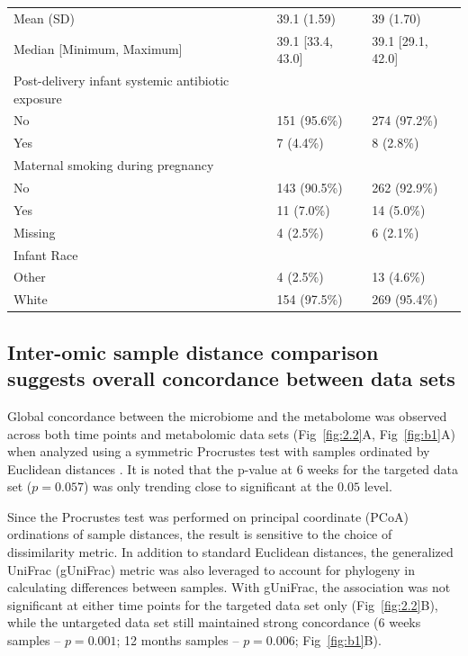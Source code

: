 \begin{table}[]
\begin{tabular}{@{}lll@{}}
\hspace{3mm} Mean (SD) & 39.1 (1.59)    & 39 (1.70) \\
\hspace{3mm} Median {[}Minimum, Maximum{]} & 39.1 {[}33.4, 43.0{]}  & 39.1 {[}29.1, 42.0{]} \\ \midrule
Post-delivery infant systemic antibiotic exposure & & \\
\hspace{3mm} No & 151 (95.6\%)    & 274 (97.2\%) \\
\hspace{3mm} Yes & 7 (4.4\%)    & 8 (2.8\%) \\ \midrule
Maternal smoking during pregnancy & & \\
\hspace{3mm} No & 143 (90.5\%)    & 262 (92.9\%) \\
\hspace{3mm} Yes & 11 (7.0\%)    & 14 (5.0\%) \\
\hspace{3mm} Missing & 4 (2.5\%)    & 6 (2.1\%) \\ \midrule
Infant Race & & \\ 
\hspace{3mm} Other & 4 (2.5\%)    & 13 (4.6\%) \\
\hspace{3mm} White & 154 (97.5\%)    & 269 (95.4\%) \\ \bottomrule
\end{tabular}
\end{table}

\subsection{Inter-omic sample distance comparison suggests overall concordance between data sets} 

Global concordance between the microbiome and the metabolome was observed across both time points and metabolomic data sets (Fig~\ref{fig:2.2}A, Fig~\ref{fig:b1}A) when analyzed using a symmetric Procrustes test with samples ordinated by Euclidean distances . It is noted that the p-value at 6 weeks for the targeted data set ($p = 0.057$) was only trending close to significant at the $0.05$ level.  

Since the Procrustes test was performed on principal coordinate (PCoA) ordinations of sample distances, the result is sensitive to the choice of dissimilarity metric. In addition to standard Euclidean distances, the generalized UniFrac (gUniFrac) metric was also leveraged to account for phylogeny in calculating differences between samples. With gUniFrac, the association was not significant at either time points for the targeted data set only (Fig~\ref{fig:2.2}B), while the untargeted data set still maintained strong concordance (6 weeks samples -- $p = 0.001$; 12 months samples -- $p = 0.006$; Fig~\ref{fig:b1}B). 
 
